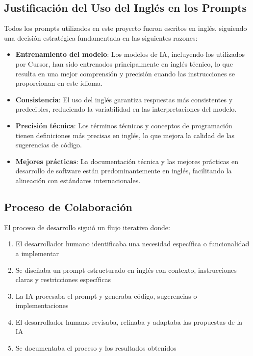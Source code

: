 \documentclass[12pt,a4paper]{article}
\begin{document}
\subsection{Justificación del Uso del Inglés en los Prompts}

Todos los prompts utilizados en este proyecto fueron escritos en inglés, siguiendo una decisión estratégica fundamentada en las siguientes razones:

\begin{itemize}
    \item \textbf{Entrenamiento del modelo}: Los modelos de IA, incluyendo los utilizados por Cursor, han sido entrenados principalmente en inglés técnico, lo que resulta en una mejor comprensión y precisión cuando las instrucciones se proporcionan en este idioma.
    \item \textbf{Consistencia}: El uso del inglés garantiza respuestas más consistentes y predecibles, reduciendo la variabilidad en las interpretaciones del modelo.
    \item \textbf{Precisión técnica}: Los términos técnicos y conceptos de programación tienen definiciones más precisas en inglés, lo que mejora la calidad de las sugerencias de código.
    \item \textbf{Mejores prácticas}: La documentación técnica y las mejores prácticas en desarrollo de software están predominantemente en inglés, facilitando la alineación con estándares internacionales.
\end{itemize}

\subsection{Proceso de Colaboración}

El proceso de desarrollo siguió un flujo iterativo donde:

\begin{enumerate}
    \item El desarrollador humano identificaba una necesidad específica o funcionalidad a implementar
    \item Se diseñaba un prompt estructurado en inglés con contexto, instrucciones claras y restricciones específicas
    \item La IA procesaba el prompt y generaba código, sugerencias o implementaciones
    \item El desarrollador humano revisaba, refinaba y adaptaba las propuestas de la IA
    \item Se documentaba el proceso y los resultados obtenidos
\end{enumerate}
\end{document}
